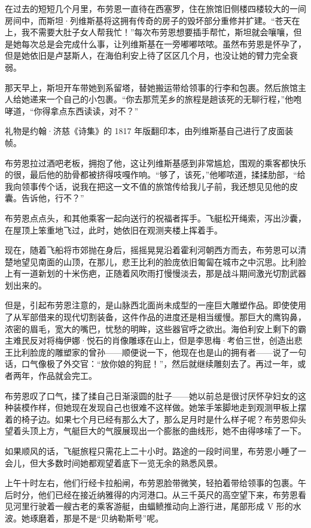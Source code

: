 \documentclass[AutoFakeBold=true]{book}
\begin{document}
在过去的短短几个月里，布劳恩一直待在西塞罗，住在旅馆旧侧楼四楼较大的一间房间中，而斯坦·列维斯基将这拥有传奇的房子的毁坏部分重修并扩建。``苍天在上，我不需要大肚子女人帮我忙！''每次布劳恩想要插手帮忙，斯坦就会嚷嚷，但是她每次总是会完成什么事，让列维斯基在一旁嘟嘟哝哝。虽然布劳恩是怀孕了，但是她依旧是卢瑟斯人，在海伯利安上待了区区几个月，也没让她的臂力完全衰弱。

那天早上，斯坦开车带她到系留塔，替她搬运带给领事的行李和包裹。然后旅馆主人给她递来一个自己的小包裹。``你去那荒芜乡的旅程是趟该死的无聊行程，''他咆哮道，``你得拿点东西读读，对不？''

礼物是约翰·济慈《诗集》的 1817 年版翻印本，由列维斯基自己进行了皮面装帧。

布劳恩拉过酒吧老板，拥抱了他，这让列维斯基感到非常尴尬，围观的乘客都快乐的很，最后他的肋骨都被挤得吱嘎作响。``够了，该死，''他嘟哝道，揉揉肋部，``给我向领事传个话，说我在把这一文不值的旅馆传给我儿子前，我还想见见他的皮囊。告诉他，行不？''

布劳恩点点头，和其他乘客一起向送行的祝福者挥手。飞艇松开绳索，泻出沙囊，在屋顶上笨重地飞过，此时，她依旧在观测夹楼上挥着手。

现在，随着飞船将市郊抛在身后，摇摇晃晃沿着霍利河朝西方而去，布劳恩可以清楚地望见南面的山顶，在那儿，悲王比利的脸庞依旧匍匐在城市之中沉思。比利脸上有一道新划的十米伤疤，正随着风吹雨打慢慢淡去，那是战斗期间激光切割武器划出来的。

但是，引起布劳恩注意的，是山脉西北面尚未成型的一座巨大雕塑作品。即使使用了从军部借来的现代切割装备，这件作品的进度还是相当缓慢。那巨大的鹰钩鼻，浓密的眉毛，宽大的嘴巴，忧愁的明眸，这些器官呼之欲出。海伯利安上剩下的霸主难民反对将梅伊娜·悦石的肖像雕琢在山上，但是李思梅·考伯三世，创造出悲王比利脸庞的雕塑家的曾孙——顺便说一下，他现在也是山的拥有者——说了一句话，口气像极了外交官：``放你娘的狗屁！''，然后就继续雕刻去了。再过一年，或者两年，作品就会完工。

布劳恩叹了口气，揉了揉自己日渐滚圆的肚子——她以前总是很讨厌怀孕妇女的这种装模作样，但她现在发现自己也很难不这样做。她笨手笨脚地走到观测甲板上摆着的椅子边。{\kaishu 如果七个月已经有那么大了，那么足月时是什么样子呢？}布劳恩仰头望着头顶上方，气艇巨大的气膜展现出一个膨胀的曲线形，她不由得哆嗦了一下。

\vspace*{1em}

如果顺风的话，飞艇旅程只需花上二十小时。路途的一段时间里，布劳恩小睡了一会儿，但大多数时间她都观望着底下一览无余的熟悉风景。

上午十时左右，他们行经卡拉船闸，布劳恩脸带微笑，轻拍着带给领事的包裹。午后时分，他们已经在接近纳雅得的内河港口。从三千英尺的高空望下来，布劳恩看见河里行驶着一艘古老的乘客游艇，由蝠鲼推动向上游行进，尾部形成 V 形的水波。她琢磨着，那是不是``贝纳勒斯号''呢。
\end{document}
